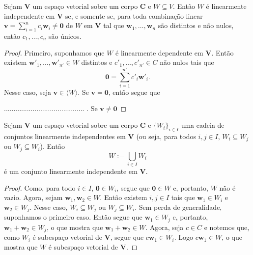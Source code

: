 \begin{prop}
	Sejam $\bm V$ um espaço vetorial sobre um corpo $\bm C$ e $W \subseteq V$. Então $W$ é linearmente independente em $\bm V$ se, e somente se, para toda combinação linear $\bm v = \sum_{i=1}^n c_i\bm w_i \neq \bm 0$ de $W$ em $\bm V$ tal que $\bm w_1,\ldots,\bm w_n$ são distintos e não nulos, então $c_1,\ldots,c_n$ são únicos.
\end{prop}
\begin{proof}
	Primeiro, suponhamos que $W$ é linearmente dependente em $\bm V$. Então existem $\bm w'_1, \ldots,\bm w'_{n'} \in W$ distintos e $c'_1,\ldots,c'_{n'} \in C$ não nulos tais que
	\begin{equation*}
	\bm 0 = \sum_{i=1}^{n'} c'_i\bm w'_i.
	\end{equation*}
Nesse caso, seja $\bm v \in \langle W \rangle$. Se $\bm v = \bm 0$, então segue que









 .......................................... . Se $\bm v \neq \bm 0$










\end{proof}

\begin{prop}
	Sejam $\bm V$ um espaço vetorial sobre um corpo $\bm C$ e $\{W_i\}_{i \in I}$ uma cadeia de conjuntos linearmente independentes em $\bm V$ (ou seja, para todos $i,j \in I$, $W_i \subseteq W_j$ ou $W_j \subseteq W_i$). Então
	\begin{equation*}
	W := \bigcup_{i \in I} W_i
	\end{equation*}
é um conjunto linearmente independente em $\bm V$.
\end{prop}
\begin{proof}
	Como, para todo $i \in I$, $\bm 0 \in W_i$, segue que $\bm 0 \in W$ e, portanto, $W$ não é vazio. Agora, sejam $\bm w_1,\bm w_2 \in W$. Então existem $i,j \in I$ tais que $\bm w_1 \in W_i$ e $\bm w_2 \in W_j$. Nesse caso, $W_i \subseteq W_j$ ou $W_j \subseteq W_i$. Sem perda de generalidade, suponhamos o primeiro caso. Então segue que $\bm w_1 \in W_j$ e, portanto, $\bm w_1+\bm w_2 \in W_j$, o que mostra que $\bm w_1+\bm w_2 \in W$. Agora, seja $c \in C$ e notemos que, como $W_i$ é subespaço vetorial de $\bm V$, segue que $c\bm w_1 \in W_i$. Logo $c\bm w_1 \in W$, o que mostra que $W$ é subespaço vetorial de $\bm V$.
\end{proof}


